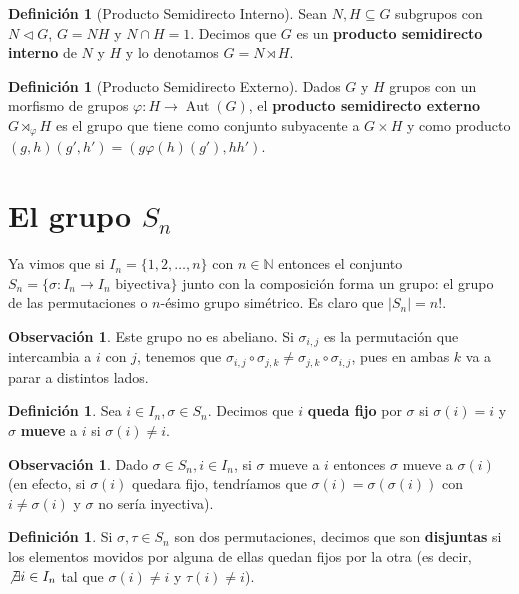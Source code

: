 \documentclass[12pt]{book}
\theoremstyle{definition}
\newtheorem{obs}[teo]{Observación}
\newtheorem{defn}[teo]{Definición}
\newcommand{\NN}{\mathbb{N}}
\DeclareMathOperator{\Aut}{Aut}
\begin{document}
\begin{defn}[Producto Semidirecto Interno]
Sean $N,H\subseteq G$ subgrupos con $N\triangleleft G$, $G=NH$ y $N\cap H = 1$. Decimos que $G$ es un \textbf{producto semidirecto interno} de $N$ y $H$ y lo denotamos $G= N \rtimes H$.
\end{defn}
\begin{defn}[Producto Semidirecto Externo]
Dados $G$ y $H$ grupos con un morfismo de grupos $\varphi:H\to \Aut (G)$, el \textbf{producto semidirecto externo} $G\rtimes_{\varphi} H$ es el grupo que tiene como conjunto subyacente a $G\times H$ y como producto $(g,h)(g',h') = (g\varphi (h)(g') , hh')$.
\end{defn}


\section{El grupo \texorpdfstring{$S_n$}{Sn}}

Ya vimos que si $I_n = \{1,2,\ldots ,n\}$ con $n\in \NN$ entonces el conjunto $S_n = \{\sigma:I_n\to I_n \text{ biyectiva}\}$ junto con la composición forma un grupo: el grupo de las permutaciones o $n$-ésimo grupo simétrico. Es claro que $|S_n|=n!$.

\begin{obs}
Este grupo no es abeliano. Si $\sigma_{i,j}$ es la permutación que intercambia a $i$ con $j$, tenemos que $\sigma_{i,j}\circ \sigma_{j,k} \neq \sigma_{j,k}\circ \sigma_{i,j}$, pues en ambas $k$ va a parar a distintos lados.
\end{obs}

\begin{defn}
Sea $i\in I_n, \sigma\in S_n$. Decimos que $i$ \textbf{queda fijo} por $\sigma$ si $\sigma (i)=i$ y $\sigma$ \textbf{mueve} a $i$ si $\sigma (i)\neq i$.
\end{defn}

\begin{obs}
Dado $\sigma\in S_n, i\in I_n$, si $\sigma$ mueve a $i$ entonces $\sigma$ mueve a $\sigma(i)$ (en efecto, si $\sigma(i)$ quedara fijo, tendríamos que $\sigma(i) = \sigma(\sigma(i))$ con $i\neq \sigma(i)$ y $\sigma$ no sería inyectiva).
\end{obs}

\begin{defn}
Si $\sigma,\tau \in S_n$ son dos permutaciones, decimos que son \textbf{disjuntas} si los elementos movidos por alguna de ellas quedan fijos por la otra (es decir, $\not\exists i\in I_n$ tal que $\sigma(i)\neq i$ y $\tau(i)\neq i$).
\end{defn}
\end{document}
